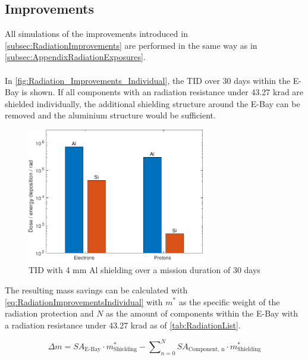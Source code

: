 \newpage

\subsection{Improvements}

\label{app:AppendixRadiationImprovements}

All simulations of the improvements introduced in \autoref{subsec:RadiationImprovements} are performed in the same way as in \autoref{subsec:AppendixRadiationExposures}. \\ \\
In \autoref{fig:Radiation_Improvements_Individual}, the TID over 30 days within the E-Bay is shown. If all components with an radiation resistance under 43.27 krad are shielded individually, the additional shielding structure around the E-Bay can be removed and the aluminium structure would be sufficient.

\begin{figure}[htp]
	\centering
	\includegraphics[width=0.7\textwidth]{Media/J_Improvements_Individual}
	\caption{TID with 4 mm Al shielding over a mission duration of 30 days}
	\label{fig:Radiation_Improvements_Individual}
\end{figure}

The resulting mass savings can be calculated with \autoref{eq:RadiationImprovementsIndividual} with \(m^*\) as the specific weight of the radiation protection and \(N\) as the amount of components within the E-Bay with a radiation resistance under 43.27 krad as of \autoref{tab:RadiationList}.

\begin{equation}
	\Delta m = SA_\text{E-Bay} \cdot m^*_\text{Shielding} - \sum\nolimits_{n=0}^N SA_\text{Component, n} \cdot m^*_\text{Shielding}
	\label{eq:RadiationImprovementsIndividual}
\end{equation}

